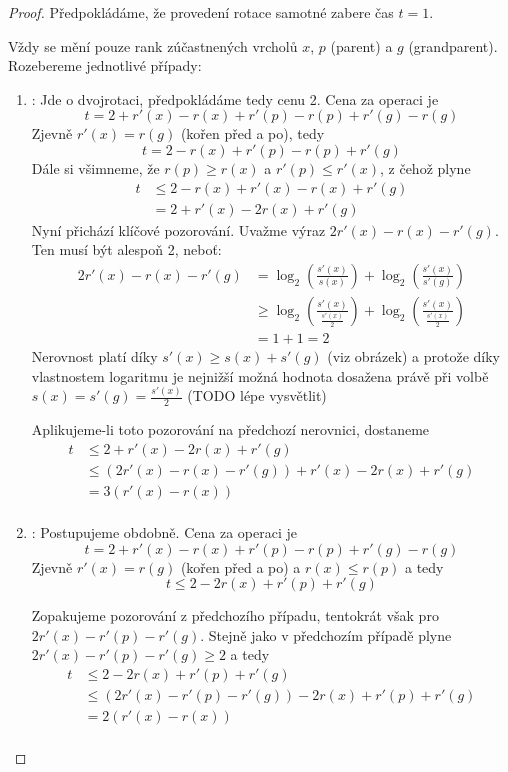 \documentclass[11pt]{report} %
\numberwithin{equation}{section}
\begin{document}
\begin{proof}
Předpokládáme, že provedení rotace samotné zabere čas $t = 1$. 

Vždy se mění pouze rank zúčastnených vrcholů $x$, $p$ (parent) a $g$ (grandparent). Rozebereme jednotlivé případy:
\begin{enumerate}
	\item \textbf{}:
	 Jde o dvojrotaci, předpokládáme tedy cenu 2. Cena za operaci je
	 $$t = 2 + r'(x) - r(x) + r'(p) - r(p) + r'(g) - r(g)$$
	 Zjevně $r'(x) = r(g)$ (kořen před a po), tedy
 	 $$t = 2 - r(x) + r'(p) - r(p) + r'(g)$$
 	 Dále si všimneme, že $r(p) \geq r(x)$ a $r'(p) \leq r'(x)$, z čehož plyne
 	 \begin{align*}
	 	t 	&\leq 2 - r(x) + r'(x) - r(x) + r'(g)\\
	 		&= 2 + r'(x) - 2r(x) + r'(g)
 	 \end{align*}
	Nyní přichází klíčové pozorování. Uvažme výraz $2r'(x) - r(x) - r'(g)$. Ten musí být alespoň 2, neboť: 	 
	\begin{align*}
		2r'(x) - r(x) - r'(g) &= \log_2\left(\frac{s'(x)}{s(x)}\right) + \log_2\left(\frac{s'(x)}{s'(g)}\right)\\
							  &\geq \log_2\left(\frac{s'(x)}{\frac{s'(x)}{2}}\right) + \log_2\left(\frac{s'(x)}{\frac{s'(x)}{2}}\right)\\
							  & = 1 + 1 = 2
	\end{align*}
	Nerovnost platí díky $s'(x) \geq s(x) + s'(g)$ (viz obrázek) a protože díky vlastnostem logaritmu je nejnižší možná hodnota dosažena právě při volbě $s(x) = s'(g) = \frac{s'(x)}{2}$ (TODO lépe vysvětlit)

	Aplikujeme-li toto pozorování na předchozí nerovnici, dostaneme	
    \begin{align*}
	t 	&\leq 2 + r'(x) - 2r(x) + r'(g) \\
		&\leq (2r'(x) - r(x) - r'(g)) + r'(x) - 2r(x) + r'(g) \\
		&= 3(r'(x) - r(x)) \\
	\end{align*}
	
	\item \textbf{}:
	Postupujeme obdobně. Cena za operaci je 
	$$t = 2 + r'(x) - r(x) + r'(p) - r(p) + r'(g) - r(g)$$
	Zjevně $r'(x) = r(g)$ (kořen před a po) a $r(x) \leq r(p)$ a tedy
	$$t \leq 2 - 2r(x) + r'(p) + r'(g)$$
	
	Zopakujeme pozorování z předchozího případu, tentokrát však pro	$2r'(x) - r'(p) - r'(g)$. Stejně jako v předchozím případě plyne $2r'(x) - r'(p) - r'(g) \geq 2$ a tedy
	\begin{align*}
	t 	&\leq 2 - 2r(x) + r'(p) + r'(g) \\
		&\leq (2r'(x) - r'(p) - r'(g)) - 2r(x) + r'(p) + r'(g) \\
		&= 2(r'(x) - r(x)) \\
	\end{align*}
		

\end{enumerate}
\end{proof}
\end{document}
